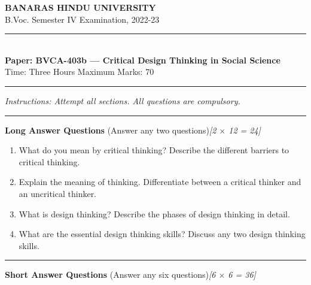 \documentclass[11pt,a4paper]{article}
\newcommand{\pts}[1]{\hfill   \textit{[#1]}}
\begin{document}
\begin{center}
  {\large\bfseries BANARAS HINDU UNIVERSITY}\\[2pt]
  {\normalsize B.Voc. Semester IV Examination, 2022-23}\\[6pt]
  \rule{0.8\linewidth}{0.5pt}\\[6pt]
  {\large\bfseries Paper: BVCA-403b --- Critical Design Thinking in Social Science}\\[4pt]
  {\normalsize Time: Three Hours \hfill Maximum Marks: 70}
\end{center}

\rule{\linewidth}{0.4pt}

\smallskip



\noindent   \textit{Instructions: Attempt all sections. All questions are compulsory.}

\bigskip

\bigskip



\rule{\linewidth}{0.4pt}\smallskip




\noindent   \textbf{Long Answer Questions} (Answer any two questions)\pts{2 $ \times$ 12 = 24}

\begin{enumerate}[label=\arabic*.,leftmargin=*,itemsep=8pt]
  \item What do you mean by critical thinking? Describe the different barriers to critical thinking.
  \item Explain the meaning of thinking. Differentiate between a critical thinker and an uncritical thinker.
  \item What is design thinking? Describe the phases of design thinking in detail.
  \item What are the essential design thinking skills? Discuss any two design thinking skills.
\end{enumerate}

\bigskip



\rule{\linewidth}{0.4pt}\smallskip




\noindent   \textbf{Short Answer Questions} (Answer any six questions)\pts{6 $ \times$ 6 = 36}
\end{document}

